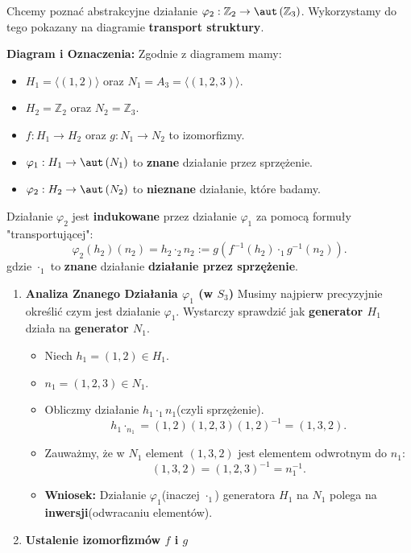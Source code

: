 \begin{goall}
	Chcemy poznać abstrakcyjne działanie $\varphi_2: \mathbb{Z}_2 \rightarrow \aut\left(\mathbb{Z}_3\right) $. Wykorzystamy do tego pokazany na diagramie \textbf{transport struktury}.  


	\textbf{Diagram i Oznaczenia:} Zgodnie z diagramem mamy:
	\begin{itemize}
		\item $H_1 = \langle \left( 1,2 \right)  \rangle $ oraz $N_1 = A_3 = \langle \left( 1,2,3 \right)  \rangle $.
		\item $H_2 = \mathbb{Z}_2$ oraz $N_2 =\mathbb{Z}_3$.
		\item $f: H_1\rightarrow H_2$ oraz $g: N_1 \rightarrow N_2$ to izomorfizmy.
		\item $\varphi_1: H_1 \rightarrow \aut\left(N_1\right) $ to \textbf{znane} działanie przez sprzężenie.
		\item $\varphi_2: H_2 \rightarrow \aut\left(N_2\right) $ to \textbf{nieznane} działanie, które badamy.
	\end{itemize}

	Działanie $\varphi_2$ jest \textbf{indukowane} przez działanie $\varphi_1$ za pomocą formuły "transportującej":
	\[
	\varphi_2\left( h_2 \right)\left( n_2 \right) = h_2\cdot _{2}n_2 := g\left( f^{-1}\left( h_2 \right) \cdot _{1} g^{-1}\left( n_2 \right)  \right) 
	.\] 
gdzie $\cdot _{1}$ to \textbf{znane} działanie \textbf{działanie przez sprzężenie}.
\begin{enumerate}[label=\textbf{Krok \arabic*.}, wide]
	\item \textbf{Analiza Znanego Działania $\varphi_1$ (w $S_3$)} 
	Musimy najpierw precyzyjnie określić czym jest działanie $\varphi_1$. Wystarczy sprawdzić jak \textbf{generator $H_1$} działa na \textbf{generator $N_1$}. 
	\begin{itemize}
		\item Niech $h_1 = \left( 1,2 \right) \in H_1.$
		\item $n_1 = \left( 1,2,3 \right) \in N_1$.
		\item Obliczmy działanie $h_1 \cdot_1 n_1$(czyli sprzężenie).
			\[
			h_1\cdot _{n_1} = \left( 1,2 \right) \left( 1,2,3 \right) \left( 1,2 \right) ^{-1} = \left( 1,3,2 \right) 
			.\] 
		\item Zauważmy, że w $N_1$ element $\left( 1,3,2 \right) $ jest elementem odwrotnym do $n_1$: 
			\[
			\left( 1,3,2 \right) = \left( 1,2,3 \right) ^{-1} = n_1^{-1} 
			.\] 

		\item \textbf{Wniosek:} Działanie $\varphi_1$(inaczej $\cdot_{1}$) generatora $H_1$ na $N_1$ polega na  \textbf{inwersji}(odwracaniu elementów).  
	\end{itemize}
\item \textbf{Ustalenie izomorfizmów $f$ i $g$} 


\end{enumerate}
\end{goall}
